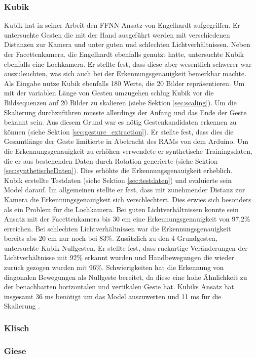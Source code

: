 \subsubsection{Kubik}
Kubik hat in seiner Arbeit den FFNN Ansatz von Engelhardt aufgegriffen. Er untersuchte Gesten die mit der Hand ausgeführt werden mit verschiedenen Distanzen zur Kamera und unter guten und schlechten Lichtverhältnissen.
Neben der Facettenkamera, die Engelhardt ebenfalls genutzt hatte, untersuchte Kubik ebenfalls eine Lochkamera. Er stellte fest, dass diese aber wesentlich schwerer war auszuleuchten, was sich auch bei der
Erkennungsgenauigkeit bemerkbar machte. Als Eingabe nutze Kubik ebenfalls 180 Werte, die 20 Bilder repräsentieren. Um mit der variablen Länge von Gesten umzugehen schlug Kubik vor die Bildsequenzen auf 20 Bilder zu
skalieren (siehe Sektion \ref{sec:scaling}). Um die Skalierung durchzuführen musste allerdings der Anfang und das Ende der Geste bekannt sein. Aus diesem Grund war es nötig Gestenkandidaten erkennen zu können (siehe
Sektion \ref{sec:gesture_extraction}). Er stellte fest, dass dies die Gesamtlänge der Geste limitierte in Abetracht des RAMs von dem Arduino. Um die Erkennungsgenauigkeit zu erhöhen verwendete er synthetische
Trainingsdaten, die er aus bestehenden Daten durch Rotation generierte (siehe Sektion \ref{sec:synthetischeDaten}). Dies erhöhte die Erkennungsgenauigkeit erheblich. Kubik erstellte Testdaten (siehe
Sektion \ref{sec:testdaten}) und evaluierte sein Model darauf. Im allgemeinen stellte er fest, dass mit zunehmender Distanz zur Kamera die Erkennungsgenauigkeit sich verschlechtert. Dies erwies sich besonders als ein
Problem für die Lochkamera. Bei guten Lichtverhältnissen konnte sein Ansatz mit der Facettenkamera bis 30 cm eine Erkennungsgenauigkeit von 97,2\% erreichen. Bei schlechten Lichtverhältnissen war die Erkennungsgenauigkeit
bereits abs 20 cm nur noch bei 83\%. Zusätzlich zu den 4 Grundgesten, untersuchte Kubik Nullgesten. Er stellte fest, dass ruckartige Veränderungen der Lichtverhältnisse mit 92\% erkannt wurden und Handbewegungen die wieder
zurück gezogen wurden mit 96\%. Schwierigkeiten hat die Erkennung von diagonalen Bewegungen als Nullgeste bereitet, da diese eine hohe Ähnlichkeit zu der benachbarten horizontalen und vertikalen Geste hat. Kubiks Ansatz
hat insgesamt 36 ms benötigt um das Model auszuwerten und 11 ms für die Skalierung \cite{kubikThesis}.

\subsubsection{Klisch}

\subsubsection{Giese}